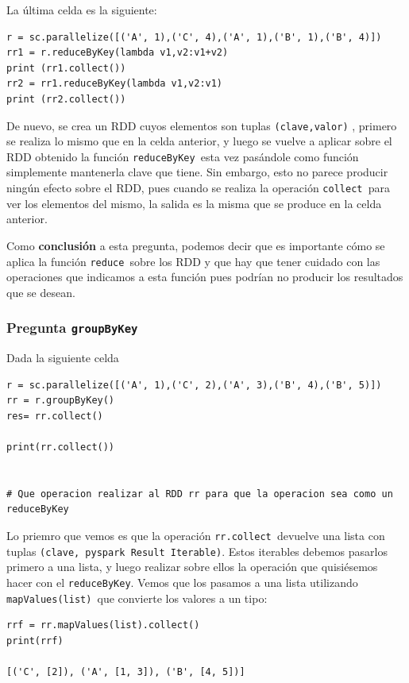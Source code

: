 \documentclass[11pt]{article}
\def\inline{\lstinline[basicstyle=\ttfamily,keywordstyle={}]}
\begin{document}
{{La última celda es la siguiente:
\begin{verbatim}
r = sc.parallelize([('A', 1),('C', 4),('A', 1),('B', 1),('B', 4)])
rr1 = r.reduceByKey(lambda v1,v2:v1+v2)
print (rr1.collect())
rr2 = rr1.reduceByKey(lambda v1,v2:v1)
print (rr2.collect())
\end{verbatim}

De nuevo, se crea un RDD cuyos elementos son tuplas  \inline{(clave,valor)} , primero se realiza lo mismo que en la celda anterior, y luego se vuelve a aplicar sobre el RDD obtenido la función \inline{reduceByKey }esta vez pasándole como función simplemente mantenerla clave que tiene. Sin embargo, esto no parece producir ningún efecto sobre el RDD, pues cuando se realiza la operación  \inline{collect }para ver los elementos del mismo, la salida es la misma que se produce en la celda anterior.

Como \textbf{conclusión} a esta pregunta, podemos decir que es importante cómo se aplica la función \inline{reduce }sobre los RDD y que hay que tener cuidado con las operaciones que indicamos a esta función pues podrían no producir los resultados que se desean. 

\subsubsection*{ Pregunta  \inline{groupByKey}}

Dada la siguiente celda
\begin{verbatim}
r = sc.parallelize([('A', 1),('C', 2),('A', 3),('B', 4),('B', 5)])
rr = r.groupByKey()
res= rr.collect()

print(rr.collect())


# Que operacion realizar al RDD rr para que la operacion sea como un reduceByKey
\end{verbatim}

Lo priemro que vemos es que la operación \inline{rr.collect }devuelve una lista con tuplas  \inline{(clave, pyspark Result Iterable)}. Estos iterables debemos pasarlos primero a una lista, y luego realizar sobre ellos la operación que quisiésemos hacer con el  \inline{reduceByKey}. Vemos que los pasamos a una lista utilizando \inline{mapValues(list) }que convierte los valores a un tipo:

\begin{verbatim}
rrf = rr.mapValues(list).collect()
print(rrf)

[('C', [2]), ('A', [1, 3]), ('B', [4, 5])]
\end{verbatim}

}}
\end{document}
